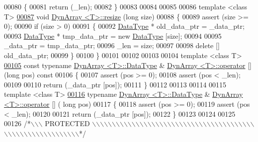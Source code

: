 \begin{DoxyCode}
00080 \{
00081     \textcolor{keywordflow}{return} (\_len);
00082 \}
00083 
00084 
00085 
00086 \textcolor{keyword}{template} <\textcolor{keyword}{class} T>
\hypertarget{a00092_source_l00087}{}\hyperlink{a00007_a3879167bca7e35ee75596318f67e2930}{00087} \textcolor{keywordtype}{void}    \hyperlink{a00007}{DynArray <T>::resize} (\textcolor{keywordtype}{long} size)
00088 \{
00089     assert (size >= 0);
00090     \textcolor{keywordflow}{if} (size > 0)
00091     \{
00092         \hyperlink{a00007_aa21fa88c73e511acb18a7e778190ab02}{DataType} *      old\_data\_ptr = \_data\_ptr;
00093         \hyperlink{a00007_aa21fa88c73e511acb18a7e778190ab02}{DataType} *      tmp\_data\_ptr = \textcolor{keyword}{new} \hyperlink{a00007_aa21fa88c73e511acb18a7e778190ab02}{DataType} [size];
00094 
00095         \_data\_ptr = tmp\_data\_ptr;
00096         \_len = size;
00097 
00098         \textcolor{keyword}{delete} [] old\_data\_ptr;
00099     \}
00100 \}
00101 
00102 
00103 
00104 \textcolor{keyword}{template} <\textcolor{keyword}{class} T>
\hypertarget{a00092_source_l00105}{}\hyperlink{a00007_a502aab733f04c8fed33348bce9f49e92}{00105} \textcolor{keyword}{const} \textcolor{keyword}{typename} \hyperlink{a00007_aa21fa88c73e511acb18a7e778190ab02}{DynArray <T>::DataType} &   
      \hyperlink{a00007}{DynArray <T>::operator} [] (\textcolor{keywordtype}{long} pos) \textcolor{keyword}{const}
00106 \{
00107     assert (pos >= 0);
00108     assert (pos < \_len);
00109 
00110     \textcolor{keywordflow}{return} (\_data\_ptr [pos]);
00111 \}
00112 
00113 
00114 
00115 \textcolor{keyword}{template} <\textcolor{keyword}{class} T>
\hypertarget{a00092_source_l00116}{}\hyperlink{a00007_a79c769ea7c52d0fbbe67831380b9a89c}{00116} \textcolor{keyword}{typename} \hyperlink{a00007_aa21fa88c73e511acb18a7e778190ab02}{DynArray <T>::DataType} & \hyperlink{a00007}{DynArray <T>::operator} [] (\textcolor{keywordtype}{
      long} pos)
00117 \{
00118     assert (pos >= 0);
00119     assert (pos < \_len);
00120 
00121     \textcolor{keywordflow}{return} (\_data\_ptr [pos]);
00122 \}
00123 
00124 
00125 
00126 \textcolor{comment}{/*\(\backslash\)\(\backslash\)\(\backslash\) PROTECTED \(\backslash\)\(\backslash\)\(\backslash\)\(\backslash\)\(\backslash\)\(\backslash\)\(\backslash\)\(\backslash\)\(\backslash\)\(\backslash\)\(\backslash\)\(\backslash\)\(\backslash\)\(\backslash\)\(\backslash\)\(\backslash\)\(\backslash\)\(\backslash\)\(\backslash\)\(\backslash\)\(\backslash\)\(\backslash\)\(\backslash\)\(\backslash\)\(\backslash\)\(\backslash\)\(\backslash\)\(\backslash\)\(\backslash\)\(\backslash\)\(\backslash\)\(\backslash\)\(\backslash\)\(\backslash\)\(\backslash\)\(\backslash\)\(\backslash\)\(\backslash\)\(\backslash\)\(\backslash\)\(\backslash\)\(\backslash\)\(\backslash\)\(\backslash\)\(\backslash\)\(\backslash\)\(\backslash\)\(\backslash\)\(\backslash\)\(\backslash\)\(\backslash\)\(\backslash\)\(\backslash\)\(\backslash\)\(\backslash\)\(\backslash\)\(\backslash\)\(\backslash\)\(\backslash\)\(\backslash\)*/}

\end{DoxyCode}
